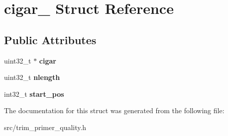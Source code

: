 \hypertarget{structcigar__}{}\section{cigar\+\_\+ Struct Reference}
\label{structcigar__}
\subsection*{Public Attributes}
\begin{DoxyCompactItemize}
\item 
\mbox{\label{structcigar___a2c1930b861900fc79213a615c84fc2fb}} 
uint32\+\_\+t $\ast$ {\bfseries cigar}
\item 
\mbox{\label{structcigar___a45a3bbf4787f09a712a05b657d516ba3}} 
uint32\+\_\+t {\bfseries nlength}
\item 
\mbox{\label{structcigar___ac23b36981c2b3334921345222ff8a19e}} 
int32\+\_\+t {\bfseries start\+\_\+pos}
\end{DoxyCompactItemize}


The documentation for this struct was generated from the following file\+:\begin{DoxyCompactItemize}
\item 
src/trim\+\_\+primer\+\_\+quality.\+h\end{DoxyCompactItemize}
